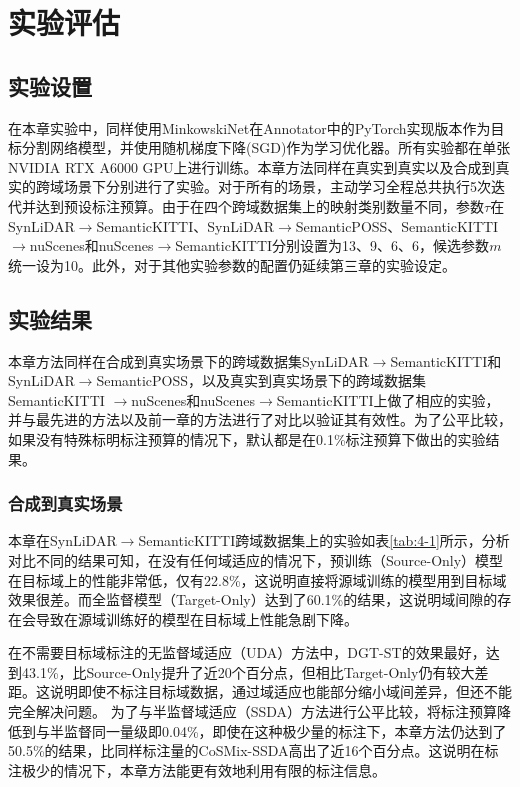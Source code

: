     \section{实验评估}
    \subsection{实验设置}
    在本章实验中，同样使用MinkowskiNet在Annotator中的PyTorch实现版本作为目标分割网络模型，并使用随机梯度下降(SGD)作为学习优化器。所有实验都在单张NVIDIA RTX A6000 GPU上进行训练。本章方法同样在真实到真实以及合成到真实的跨域场景下分别进行了实验。对于所有的场景，主动学习全程总共执行5次迭代并达到预设标注预算。由于在四个跨域数据集上的映射类别数量不同，参数$\tau$在SynLiDAR$\to$SemanticKITTI、SynLiDAR$\to$SemanticPOSS、SemanticKITTI$\to$nuScenes和nuScenes$\to$SemanticKITTI分别设置为13、9、6、6，候选参数$m$统一设为10。此外，对于其他实验参数的配置仍延续第三章的实验设定。
    \subsection{实验结果}
    本章方法同样在合成到真实场景下的跨域数据集SynLiDAR$\to$SemanticKITTI和SynLiDAR$\to$SemanticPOSS，以及真实到真实场景下的跨域数据集SemanticKITTI
    $\to$nuScenes和nuScenes$\to$SemanticKITTI上做了相应的实验，并与最先进的方法以及前一章的方法进行了对比以验证其有效性。为了公平比较，如果没有特殊标明标注预算的情况下，默认都是在0.1\%标注预算下做出的实验结果。
    \subsubsection{合成到真实场景}
    
    \vspace{-0.2cm}
    本章在SynLiDAR$\to$SemanticKITTI跨域数据集上的实验如表\ref{tab:4-1}所示，分析对比不同的结果可知，在没有任何域适应的情况下，预训练（Source-Only）模型在目标域上的性能非常低，仅有22.8\%，这说明直接将源域训练的模型用到目标域效果很差。而全监督模型（Target-Only）达到了60.1\%的结果，这说明域间隙的存在会导致在源域训练好的模型在目标域上性能急剧下降。

    在不需要目标域标注的无监督域适应（UDA）方法中，DGT-ST的效果最好，达到43.1\%，比Source-Only提升了近20个百分点，但相比Target-Only仍有较大差距。这说明即使不标注目标域数据，通过域适应也能部分缩小域间差异，但还不能完全解决问题。
    为了与半监督域适应（SSDA）方法进行公平比较，将标注预算降低到与半监督同一量级即0.04\%，即使在这种极少量的标注下，本章方法仍达到了50.5\%的结果，比同样标注量的CoSMix-SSDA高出了近16个百分点。这说明在标注极少的情况下，本章方法能更有效地利用有限的标注信息。

